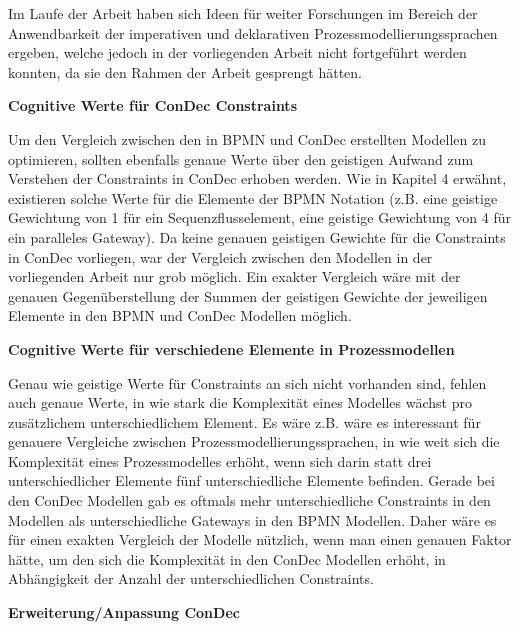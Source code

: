 Im Laufe der Arbeit haben sich Ideen für weiter Forschungen im Bereich der Anwendbarkeit der imperativen und deklarativen Prozessmodellierungssprachen ergeben, welche jedoch in der vorliegenden Arbeit nicht fortgeführt werden konnten, da sie den Rahmen der Arbeit gesprengt hätten.\newline

\textbf{Cognitive Werte für ConDec Constraints}

Um den Vergleich zwischen den in BPMN und ConDec erstellten Modellen zu optimieren, sollten ebenfalls genaue Werte über den geistigen Aufwand zum Verstehen der Constraints in ConDec erhoben werden. Wie in Kapitel 4 erwähnt, existieren solche Werte für die Elemente der BPMN Notation (z.B. eine geistige Gewichtung von 1 für ein Sequenzflusselement, eine geistige Gewichtung von 4 für ein paralleles Gateway). Da keine genauen geistigen Gewichte für die Constraints in ConDec vorliegen, war der Vergleich zwischen den Modellen in der vorliegenden Arbeit nur grob möglich. Ein exakter Vergleich wäre mit der genauen Gegenüberstellung der Summen der geistigen Gewichte der jeweiligen Elemente in den BPMN und ConDec Modellen möglich.\newline

\textbf{Cognitive Werte für verschiedene Elemente in Prozessmodellen}

Genau wie geistige Werte für Constraints an sich nicht vorhanden sind, fehlen auch genaue Werte, in wie stark die Komplexität eines Modelles wächst pro zusätzlichem unterschiedlichem Element. Es wäre z.B. wäre es interessant für genauere Vergleiche zwischen Prozessmodellierungssprachen, in wie weit sich die Komplexität eines Prozessmodelles erhöht, wenn sich darin statt drei unterschiedlicher Elemente fünf unterschiedliche Elemente befinden. Gerade bei den ConDec Modellen gab es oftmals mehr unterschiedliche Constraints in den Modellen als unterschiedliche Gateways in den BPMN Modellen. Daher wäre es für einen exakten Vergleich der Modelle nützlich, wenn man einen genauen Faktor hätte, um den sich die Komplexität in den ConDec Modellen erhöht, in Abhängigkeit der Anzahl der unterschiedlichen Constraints.  


\textbf{Erweiterung/Anpassung ConDec}

